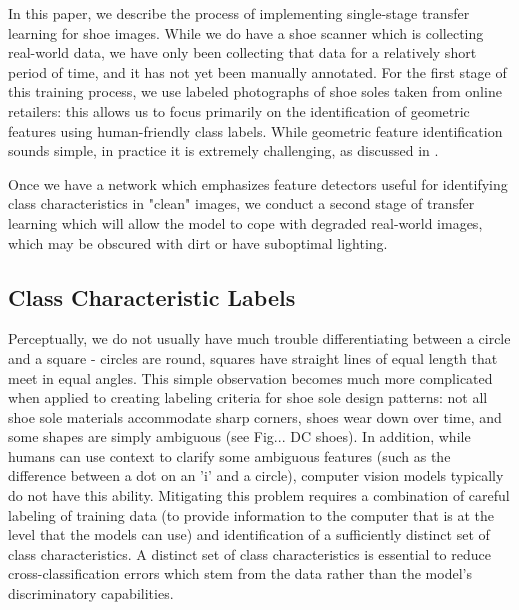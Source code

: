 \documentclass[10pt]{article}
\newcommand{\svp}[1]{{\textcolor{RedOrange}{#1}}}
\begin{document}
\svp{
In this paper, we describe the process of implementing single-stage transfer learning for shoe images.
While we do have a shoe scanner which is collecting real-world data, we have only been collecting that data for a relatively short period of time, and it has not yet been manually annotated.
For the first stage of this training process, we use labeled photographs of shoe soles taken from online retailers: this allows us to focus primarily on the identification of geometric features using human-friendly class labels.
While geometric feature identification sounds simple, in practice it is extremely challenging, as discussed in \Cref{sec:classification-scheme}.}


\svp{Once we have a network which emphasizes feature detectors useful for identifying class characteristics in "clean" images, we conduct a second stage of transfer learning which will allow the model to cope with degraded real-world images, which may be obscured with dirt or have suboptimal lighting.}

\subsection{Class Characteristic Labels}\label{sec:classification-scheme}
\svp{
Perceptually, we do not usually have much trouble differentiating between a circle and a square - circles are round, squares have straight lines of equal length that meet in equal angles.
This simple observation becomes much more complicated when applied to creating labeling criteria for shoe sole design patterns: not all shoe sole materials accommodate sharp corners, shoes wear down over time, and some shapes are simply ambiguous (see Fig... DC shoes).
In addition, while humans can use context to clarify some ambiguous features (such as the difference between a dot on an 'i' and a circle), computer vision models typically do not have this ability.
Mitigating this problem requires a combination of careful labeling of training data (to provide information to the computer that is at the level that the models can use) and identification of a sufficiently distinct set of class characteristics.
A distinct set of class characteristics is essential to reduce cross-classification errors which stem from the data rather than the model's discriminatory capabilities.
}
\end{document}
